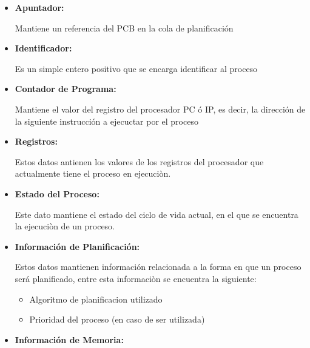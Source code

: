 \documentclass[12pt, fleqn]{report}                             %
\begin{document}
            \begin{itemize}
                \item
                    \textbf{Apuntador:}

                    Mantiene un referencia del PCB en la cola de planificación

                \item
                    \textbf{Identificador:}

                    Es un simple entero positivo que se encarga identificar al proceso

                \item
                    \textbf{Contador de Programa:}

                    Mantiene el valor del registro del procesador PC ó IP, es decir, la dirección
                    de la siguiente instrucción a ejecuctar por el proceso

                \item
                    \textbf{Registros:}

                    Estos datos antienen los valores de los registros del procesador que actualmente
                    tiene el proceso en ejecuciòn.
                \item
                    \textbf{Estado del Proceso:}

                    Este dato mantiene el estado del ciclo de vida actual, en el que se encuentra
                    la ejecuciòn de un proceso.

                \item
                    \textbf{Información de Planificación:}

                        Estos datos mantienen información relacionada a la forma en que un proceso será
                        planificado, entre esta informaciòn se encuentra la siguiente: 

                            \begin{itemize}
                                \item Algoritmo de planificacion utilizado 
                                \item Prioridad del proceso (en caso de ser utilizada)
                            \end{itemize}

                \clearpage

                \item
                    \textbf{Información de Memoria:}


\end{itemize}
\end{document}
